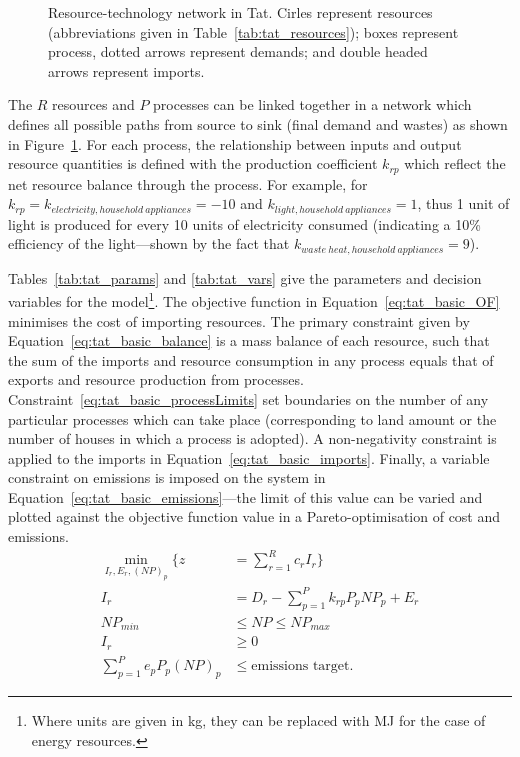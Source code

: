 \begin{figure}[h]
	\centering
	
	\caption{Resource-technology network in Tat. Cirles represent resources (abbreviations given in Table~\ref{tab:tat_resources}); boxes represent process, dotted arrows represent demands; and double headed arrows represent imports.} \label{fig:tat_network}
\end{figure}

 

The $R$ resources and $P$ processes can be linked together in a network which defines all possible paths from source to sink (final demand and wastes) as shown in Figure~\ref{fig:tat_network}. For each process, the relationship between inputs and output resource quantities is defined with the production coefficient $k_{rp}$ which reflect the net resource balance through the process. For example, for $k_{rp}=k_{electricity, household~appliances}=-10$ and $k_{light, household~appliances}=1$, thus 1 unit of light is produced for every 10 units of electricity consumed (indicating a 10\% efficiency of the light---shown by the fact that $k_{waste~heat, household~appliances}=9$).

Tables~\ref{tab:tat_params} and \ref{tab:tat_vars} give the parameters and decision variables for the model\footnote{Where units are given in kg, they can be replaced with MJ for the case of energy resources.}. The objective function in Equation~\eqref{eq:tat_basic_OF} minimises the cost of importing resources. The primary constraint given by Equation~\eqref{eq:tat_basic_balance} is a mass balance of each resource, such that the sum of the imports and resource consumption in any process equals that of exports and resource production from processes. Constraint~\eqref{eq:tat_basic_processLimits} set boundaries on the number of any particular processes which can take place (corresponding to land amount or the number of houses in which a process is adopted). A non-negativity constraint is applied to the imports in Equation~\eqref{eq:tat_basic_imports}. Finally, a variable constraint on emissions is imposed on the system in Equation~\eqref{eq:tat_basic_emissions}---the limit of this value can be varied and plotted against the objective function value in a Pareto-optimisation of cost and emissions.
\begin{align}
	\min_{I_r,E_r,(NP)_p} \Bigg\{z&=\sum_{r=1}^R c_rI_{r} \Bigg\} \label{eq:tat_basic_OF} \\
	I_r&=D_r-\sum_{p=1}^{P}k_{rp} P_p NP_p + E_r \label{eq:tat_basic_balance} \\
	NP_{min} &\leq NP \leq NP_{max} \label{eq:tat_basic_processLimits} \\			
	I_r &\geq 0 \label{eq:tat_basic_imports} \\
	\sum_{p=1}^P e_p P_p (NP)_p &\leq \mbox{emissions target} \label{eq:tat_basic_emissions}.
\end{align}
 
 


